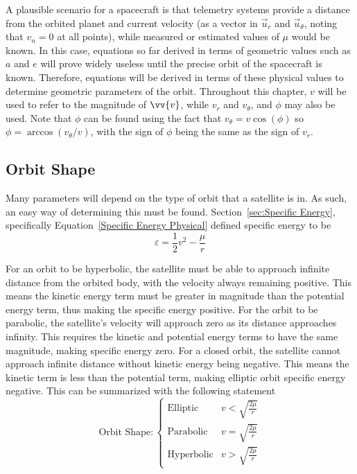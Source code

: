 \documentclass[../basicOrbitalDynamics.tex]{subfiles}
\begin{document}
A plausible scenario for a spacecraft is that telemetry systems provide a distance from the orbited planet and current velocity (as a vector in $\vec{u}_r$ and $\vec{u}_\theta$, noting that $v_n=0$ at all points), while measured or estimated values of $\mu$ would be known. In this case, equations so far derived in terms of geometric values such as $a$ and $e$ will prove widely useless until the precise orbit of the spacecraft is known. Therefore, equations will be derived in terms of these physical values to determine geometric parameters of the orbit. Throughout this chapter, $v$ will be used to refer to the magnitude of $\vv{v}$, while $v_r$ and $v_\theta$, and $\phi$ may also be used. Note that $\phi$ can be found using the fact that $v_\theta=v\cos(\phi)$ so $\phi=\arccos(v_\theta/v)$, with the sign of $\phi$ being the same as the sign of $v_r$.

\bigskip\bigskip
\subsection{Orbit Shape}

Many parameters will depend on the type of orbit that a satellite is in. As such, an easy way of determining this must be found. Section~\ref{sec:Specific Energy}, specifically Equation~\eqref{Specific Energy Physical} defined specific energy to be
\[\varepsilon=\frac{1}{2}v^2-\frac{\mu}{r}\]

For an orbit to be hyperbolic, the satellite must be able to approach infinite distance from the orbited body, with the velocity always remaining positive. This means the kinetic energy term must be greater in magnitude than the potential energy term, thus making the specific energy positive. For the orbit to be parabolic, the satellite's velocity will approach zero as its distance approaches infinity. This requires the kinetic and potential energy terms to have the same magnitude, making specific energy zero. For a closed orbit, the satellite cannot approach infinite distance without kinetic energy being negative. This means the kinetic term is less than the potential term, making elliptic orbit specific energy negative. This can be summarized with the following statement
\begin{equation}\label{Orbit Shape Physical}
    \text{Orbit Shape}: \begin{cases}
        \text{Elliptic}   & v<\sqrt{\frac{2\mu}{r}} \\
        \text{Parabolic}  & v=\sqrt{\frac{2\mu}{r}} \\
        \text{Hyperbolic} & v>\sqrt{\frac{2\mu}{r}}
    \end{cases}
\end{equation}
\end{document}
